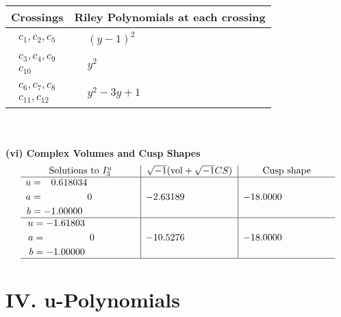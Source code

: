 \documentclass[1p]{elsarticle_modified}
\theoremstyle{definition}
\newcommand{\I}{\sqrt{-1}}
\begin{document}
\begin{tabular}{m{50pt}|m{274pt}}
Crossings & \hspace{64pt}Riley Polynomials at each crossing \\
\hline $$\begin{aligned}c_{1},c_{2},c_{5}\end{aligned}$$&$\begin{aligned}
&(y-1)^2
\end{aligned}$\\
\hline $$\begin{aligned}c_{3},c_{4},c_{9}\\c_{10}\end{aligned}$$&$\begin{aligned}
&y^2
\end{aligned}$\\
\hline $$\begin{aligned}c_{6},c_{7},c_{8}\\c_{11},c_{12}\end{aligned}$$&$\begin{aligned}
&y^2-3 y+1
\end{aligned}$\\
\hline
\end{tabular}\\~\\
\newpage\flushleft \textbf{(vi) Complex Volumes and Cusp Shapes}
$$\begin{array}{c|c|c}  
\text{Solutions to }I^u_{3}& \I (\text{vol} + \sqrt{-1}CS) & \text{Cusp shape}\\
 \hline 
\begin{aligned}
u &= \phantom{-}0.618034\phantom{ +0.000000I} \\
a &= \phantom{-0.000000 } 0 \\
b &= -1.00000\phantom{ +0.000000I}\end{aligned}
 & -2.63189\phantom{ +0.000000I} & -18.0000\phantom{ +0.000000I} \\ \hline\begin{aligned}
u &= -1.61803\phantom{ +0.000000I} \\
a &= \phantom{-0.000000 } 0 \\
b &= -1.00000\phantom{ +0.000000I}\end{aligned}
 & -10.5276\phantom{ +0.000000I} & -18.0000\phantom{ +0.000000I}\\
 \hline 
 \end{array}$$\newpage
\newpage\renewcommand{\arraystretch}{1}
\centering \section*{ IV. u-Polynomials}
\end{document}
